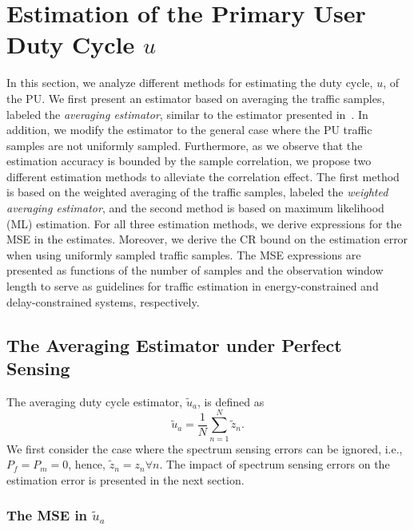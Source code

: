 \documentclass[11pt,draftclsnofoot,journal,onecolumn]{IEEEtran}
\begin{document}
\section{Estimation of the Primary User Duty Cycle $u$}
\label{sec:squared_error}

In this section, we analyze different methods for estimating the duty cycle, $u$, of the PU. We first present an estimator based on averaging the traffic samples, labeled the \emph{averaging estimator}, similar to the estimator presented in~\cite{kim_tmc_2008,kim_dyspan_2008,liang_ita_2010,liang_tmc_2011}. In addition, we modify the estimator to the general case where the PU traffic samples are not uniformly sampled. Furthermore, as we observe that the estimation accuracy is bounded by the sample correlation, we propose two different estimation methods to alleviate the correlation effect. The first method is based on the weighted averaging of the traffic samples, labeled the \emph{weighted averaging estimator}, and the second method is based on maximum likelihood (ML) estimation. For all three estimation methods, we derive expressions for the MSE in the estimates. Moreover, we derive the CR bound on the estimation error when using uniformly sampled traffic samples. The MSE expressions are presented as functions of the number of samples and the observation window length to serve as guidelines for traffic estimation in energy-constrained and delay-constrained systems, respectively.

\subsection{The Averaging Estimator under Perfect Sensing}
\label{sec:estimation_u}

The averaging duty cycle estimator, $\tilde{u}_a$, is defined as ~\cite[Sec. 6.1]{kim_tmc_2008}
\begin{equation}
\tilde{u}_a = \frac{1}{N} \sum_{n=1}^{N} \tilde z_n.
\label{eq;u_est}
\end{equation}
We first consider the case where the spectrum sensing errors can be ignored, i.e., $P_f = P_m = 0$, hence, $\tilde z_n = z_n \forall n$. The impact of spectrum sensing errors on the estimation error is presented in the next section.

\subsubsection{The MSE in $\tilde{u}_a$}
\label{sec:mse_u_non_uni}
\end{document}
